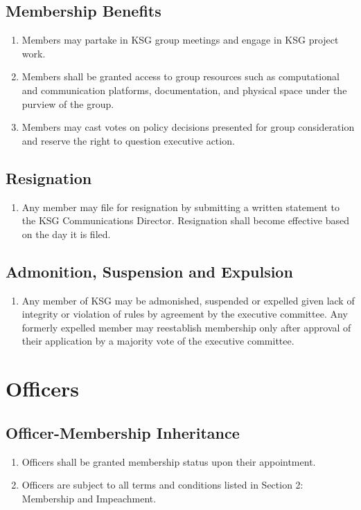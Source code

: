 \documentclass[12pt,executivepaper]{article}
\begin{document}
\subsection{Membership Benefits}
\begin{enumerate}
    \item Members may partake in KSG group meetings and engage in KSG project work.
    \item Members shall be granted access to group resources such as computational
          and communication platforms, documentation, and physical space under the
          purview of the group.
    \item Members may cast votes on policy decisions presented for group consideration
          and reserve the right to question executive action.
\end{enumerate}

\subsection{Resignation}
\begin{enumerate}
    \item Any member may file for resignation by submitting a written statement to
          the KSG Communications Director. Resignation shall become effective based
          on the day it is filed.
\end{enumerate}

\subsection{Admonition, Suspension and Expulsion}
\begin{enumerate}
    \item Any member of KSG may be admonished, suspended or expelled given lack of
          integrity or violation of rules by agreement by the executive committee.
          Any formerly expelled member may reestablish membership only after approval
          of their application by a majority vote of the executive committee.
\end{enumerate}

\section{Officers}

\subsection{Officer-Membership Inheritance}
\begin{enumerate}
    \item Officers shall be granted membership status upon their appointment.
    \item Officers are subject to all terms and conditions listed in Section 2:
          Membership and Impeachment.
\end{enumerate}
\end{document}
